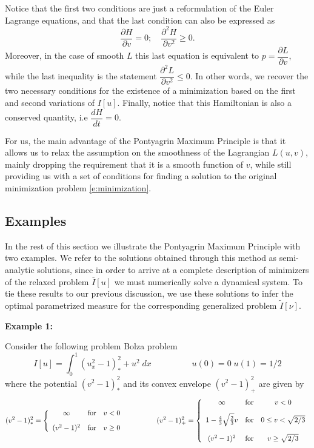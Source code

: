 \documentclass[11pt]{article}
\theoremstyle{plain}
\begin{document}
Notice that the first two conditions are just a reformulation of the Euler Lagrange equations, and that the last condition can also be expressed as 
\[ \frac{\partial H}{\partial v} = 0; \quad \frac{\partial^2H}{\partial v^2} \geq 0.\]
Moreover, in the case of smooth $L$ this last equation is equivalent to $p = \dfrac{\partial L}{\partial v}$, while the last inequality is the statement $\dfrac{\partial^2 L}{\partial v^2} \leq 0$. In other words, we recover the two necessary conditions for the existence of a minimization based on the first and second variations of $I[u]$. Finally, notice that this Hamiltonian is also a conserved quantity, i.e $\dfrac{d H}{dt} =0$.

For us, the main advantage of the Pontyagrin Maximum Principle is that it allows us to relax the assumption on the smoothness of the Lagrangian $L(u,v)$, mainly dropping the requirement that it is a smooth function of $v$, while still providing us with a set of conditions for finding a solution to the original minimization problem \eqref{e:minimization}.




\subsection{Examples}\label{s:examples}

In the rest of this section we illustrate the Pontyagrin Maximum Principle with two examples. We refer to the solutions obtained through this method as semi-analytic solutions, since in order to arrive at a complete description of minimizers of the relaxed problem $\overline{I}[u]$ we must numerically solve a dynamical system. To tie these results to our previous discussion, we use these solutions to infer the optimal parametrized measure for the corresponding generalized problem $\tilde{I}[\nu]$.


{\bf \large Example 1:} 

Consider the following problem Bolza problem
\[ I[u] = \int_0^1 (u_x^2-1)^2_* + u^2 \; dx \hspace{2cm} u(0) = 0 \;u(1) = 1/2\]
where the potential $(v^2-1)^2_*$ and its convex envelope $(v^2-1)^2_+$ are given by
\[(v^2-1)^2_*= \left \{ \begin{array}{c c c}
\infty & \mbox{for} & v<0\\[2ex]
(v^2-1)^2 & \mbox{for} & v \geq 0
\end{array} \right.
\hspace{10ex} (v^2-1)^2_+= \left \{ \begin{array}{c c c}
\infty & \mbox{for} & v <0\\[2ex]
1- \frac{4}{3} \sqrt{\frac{2}{3}}v & \mbox{for} & 0\leq v < \sqrt{2/3}\\[3ex]
(v^2-1)^2 & \mbox{for} & v \geq \sqrt{2/3}
\end{array} \right.
\]
\end{document}
